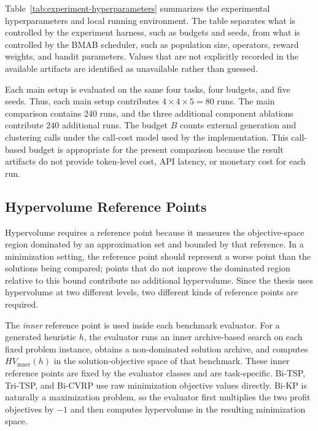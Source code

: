 Table~\ref{tab:experiment-hyperparameters} summarizes the experimental hyperparameters and local running environment. The table separates what is controlled by the experiment harness, such as budgets and seeds, from what is controlled by the BMAB scheduler, such as population size, operators, reward weights, and bandit parameters. Values that are not explicitly recorded in the available artifacts are identified as unavailable rather than guessed.



Each main setup is evaluated on the same four tasks, four budgets, and five seeds. Thus, each main setup contributes $4\times4\times5=80$ runs. The main comparison contains 240 runs, and the three additional component ablations contribute 240 additional runs. The budget $B$ counts external generation and clustering calls under the call-cost model used by the implementation. This call-based budget is appropriate for the present comparison because the result artifacts do not provide token-level cost, API latency, or monetary cost for each run.

\subsection{Hypervolume Reference Points}

Hypervolume requires a reference point because it measures the objective-space region dominated by an approximation set and bounded by that reference. In a minimization setting, the reference point should represent a worse point than the solutions being compared; points that do not improve the dominated region relative to this bound contribute no additional hypervolume. Since the thesis uses hypervolume at two different levels, two different kinds of reference points are required.

The \emph{inner} reference point is used inside each benchmark evaluator. For a generated heuristic $h$, the evaluator runs an inner archive-based search on each fixed problem instance, obtains a non-dominated solution archive, and computes $HV_{\mathrm{inner}}(h)$ in the solution-objective space of that benchmark. These inner reference points are fixed by the evaluator classes and are task-specific. Bi-TSP, Tri-TSP, and Bi-CVRP use raw minimization objective values directly. Bi-KP is naturally a maximization problem, so the evaluator first multiplies the two profit objectives by $-1$ and then computes hypervolume in the resulting minimization space.

